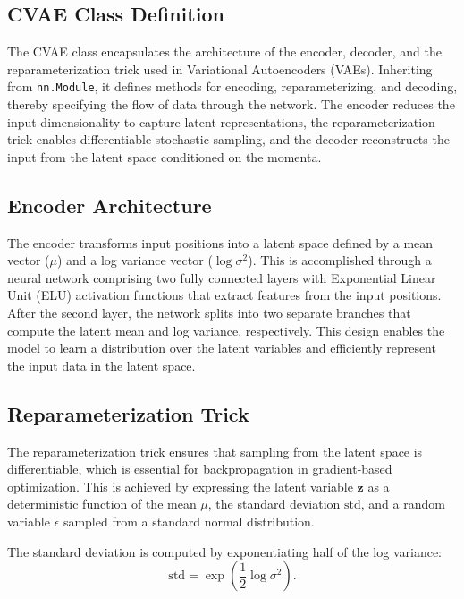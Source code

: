 \documentclass[11pt]{paper}
\begin{document}
\subsection{CVAE Class Definition}

The CVAE class encapsulates the architecture of the encoder, decoder, and the reparameterization trick used in Variational Autoencoders (VAEs). Inheriting from \texttt{nn.Module}, it defines methods for encoding, reparameterizing, and decoding, thereby specifying the flow of data through the network. The encoder reduces the input dimensionality to capture latent representations, the reparameterization trick enables differentiable stochastic sampling, and the decoder reconstructs the input from the latent space conditioned on the momenta.

\subsection{Encoder Architecture}

The encoder transforms input positions into a latent space defined by a mean vector ($\mu$) and a log variance vector ($\log\sigma^2$). This is accomplished through a neural network comprising two fully connected layers with Exponential Linear Unit (ELU) activation functions that extract features from the input positions. After the second layer, the network splits into two separate branches that compute the latent mean and log variance, respectively. This design enables the model to learn a distribution over the latent variables and efficiently represent the input data in the latent space.

\subsection{Reparameterization Trick}

The reparameterization trick ensures that sampling from the latent space is differentiable, which is essential for backpropagation in gradient-based optimization. This is achieved by expressing the latent variable $\mathbf{z}$ as a deterministic function of the mean $\mu$, the standard deviation $\text{std}$, and a random variable $\epsilon$ sampled from a standard normal distribution.

The standard deviation is computed by exponentiating half of the log variance:
\begin{equation}
\text{std} = \exp\left(\frac{1}{2} \log\sigma^2\right).
\label{eq:std}
\end{equation}
\end{document}
